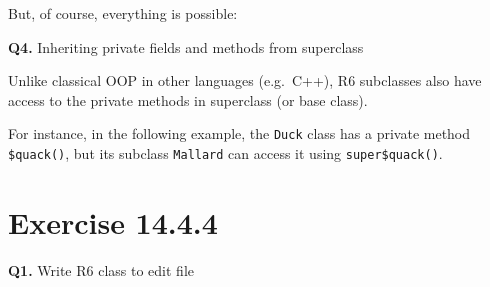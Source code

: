 \documentclass[
]{book}
\newenvironment{Shaded}{\begin{snugshade}}{\end{snugshade}}
\newcommand{\AttributeTok}[1]{\textcolor[rgb]{0.77,0.63,0.00}{#1}}
\newcommand{\CommentTok}[1]{\textcolor[rgb]{0.56,0.35,0.01}{\textit{#1}}}
\newcommand{\ControlFlowTok}[1]{\textcolor[rgb]{0.13,0.29,0.53}{\textbf{#1}}}
\newcommand{\FunctionTok}[1]{\textcolor[rgb]{0.00,0.00,0.00}{#1}}
\newcommand{\NormalTok}[1]{#1}
\newcommand{\OtherTok}[1]{\textcolor[rgb]{0.56,0.35,0.01}{#1}}
\newcommand{\SpecialCharTok}[1]{\textcolor[rgb]{0.00,0.00,0.00}{#1}}
\newcommand{\StringTok}[1]{\textcolor[rgb]{0.31,0.60,0.02}{#1}}
\begin{document}
But, of course, everything is possible:

\begin{Shaded}
\end{Shaded}

\textbf{Q4.} Inheriting private fields and methods from superclass

Unlike classical OOP in other languages (e.g.~C++), R6 subclasses also have access to the private methods in superclass (or base class).

For instance, in the following example, the \texttt{Duck} class has a private method \texttt{\$quack()}, but its subclass \texttt{Mallard} can access it using \texttt{super\$quack()}.

\begin{Shaded}
\end{Shaded}

\hypertarget{exercise-14.4.4}{%
\section{Exercise 14.4.4}\label{exercise-14.4.4}}

\textbf{Q1.} Write R6 class to edit file
\end{document}
